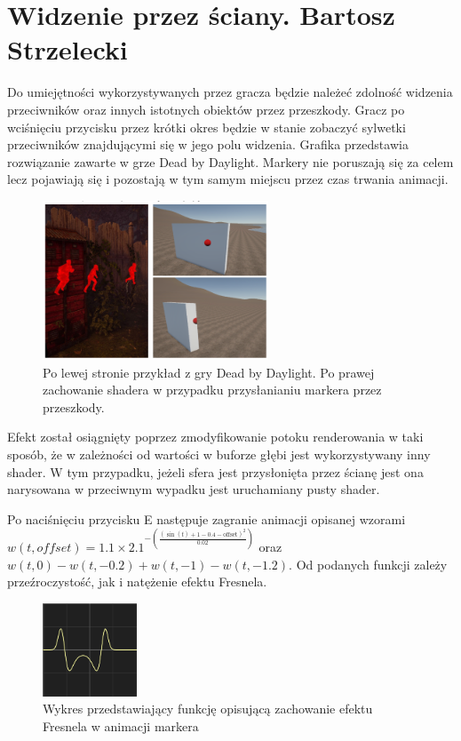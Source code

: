 \section{Widzenie przez ściany. Bartosz Strzelecki}

Do umiejętności wykorzystywanych przez gracza będzie należeć zdolność widzenia przeciwników oraz innych istotnych obiektów przez przeszkody.
Gracz po wciśnięciu przycisku przez krótki okres będzie w stanie zobaczyć sylwetki przeciwników znajdującymi się w jego polu widzenia.
Grafika przedstawia rozwiązanie zawarte w grze Dead by Daylight. Markery nie poruszają się za celem lecz pojawiają się i pozostają w tym samym miejscu przez czas trwania animacji.

\begin{figure}[h]
\centering
\includegraphics[width=0.6\textwidth]{images/shader}
\caption{Po lewej stronie przykład z gry Dead by Daylight. Po prawej zachowanie shadera w przypadku przysłanianiu markera przez przeszkody.}
\end{figure}

Efekt został osiągnięty poprzez zmodyfikowanie potoku renderowania w taki sposób, że w zależności od wartości w buforze głębi jest wykorzystywany inny shader.
W tym przypadku, jeżeli sfera jest przysłonięta przez ścianę jest ona narysowana w przeciwnym wypadku jest uruchamiany pusty shader.

Po naciśnięciu przycisku E następuje zagranie animacji opisanej wzorami $ w(t, offset) = 1.1 \times 2.1^{-\left(\frac{{\left(\sin(t) + 1 - 0.4 - \text{{offset}}\right)^2}}{{0.02}}\right)} $
oraz $ w(t, 0) - w(t, -0.2) + w(t, -1) - w(t, -1.2) $. Od podanych funkcji zależy przeźroczystość, jak i natężenie efektu Fresnela. 

\begin{figure}[h]
    \centering
    \includegraphics[width=0.25\textwidth]{images/g}
    \caption{Wykres przedstawiający funkcję opisującą zachowanie efektu Fresnela w animacji markera}
\end{figure}



